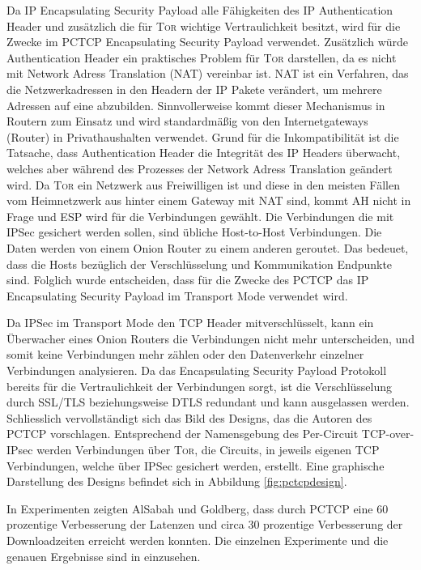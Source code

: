 \documentclass[fleqn,envcountsame,runningheads,10pt,a4paper]{llncs}
\begin{document}
Da IP Encapsulating Security Payload alle Fähigkeiten des IP Authentication Header und zusätzlich die für \textsc{Tor} wichtige Vertraulichkeit besitzt, wird für die Zwecke im PCTCP Encapsulating Security Payload verwendet.
Zusätzlich würde Authentication Header ein praktisches Problem für \textsc{Tor} darstellen, da es nicht mit Network Adress Translation (NAT) \cite{rfc:nat} vereinbar ist.
NAT ist ein Verfahren, das die Netzwerkadressen in den  Headern der IP Pakete verändert, um mehrere Adressen auf eine abzubilden.
Sinnvollerweise kommt dieser Mechanismus in Routern zum Einsatz und wird standardmäßig von den Internetgateways (Router) in Privathaushalten verwendet.
Grund für die Inkompatibilität ist die Tatsache, dass Authentication Header die Integrität des IP Headers überwacht, welches aber während des Prozesses der Network Adress Translation geändert wird.
Da \textsc{Tor} ein Netzwerk aus Freiwilligen ist und diese in den meisten Fällen vom Heimnetzwerk aus hinter einem Gateway mit NAT sind, kommt AH nicht in Frage und ESP wird für die Verbindungen gewählt.
Die Verbindungen die mit IPSec gesichert werden sollen, sind übliche Host-to-Host Verbindungen.
Die Daten werden von einem Onion Router zu einem anderen geroutet. Das bedeuet, dass die Hosts bezüglich der Verschlüsselung und Kommunikation Endpunkte sind.
Folglich wurde entscheiden, dass für die Zwecke des PCTCP das IP Encapsulating Security Payload im Transport Mode verwendet wird.

Da IPSec im Transport Mode den TCP Header mitverschlüsselt, kann ein Überwacher eines Onion Routers die Verbindungen nicht mehr unterscheiden, und somit keine Verbindungen mehr zählen oder den Datenverkehr einzelner Verbindungen analysieren.
Da das Encapsulating Security Payload Protokoll bereits für die Vertraulichkeit der Verbindungen sorgt, ist die Verschlüsselung durch SSL/TLS beziehungsweise DTLS redundant und kann ausgelassen werden.
Schliesslich vervollständigt sich das Bild des Designs, das die Autoren des PCTCP vorschlagen.
Entsprechend der Namensgebung des Per-Circuit TCP-over-IPsec werden Verbindungen über \textsc{Tor}, die Circuits, in jeweils eigenen TCP Verbindungen, welche über IPSec gesichert werden, erstellt.
Eine graphische Darstellung des Designs befindet sich in Abbildung \ref{fig:pctcpdesign}.

In Experimenten zeigten AlSabah und Goldberg, dass durch PCTCP eine 60 prozentige Verbesserung der Latenzen und circa 30 prozentige Verbesserung der Downloadzeiten erreicht werden konnten.
Die einzelnen Experimente und die genauen Ergebnisse sind in \cite{pctcp} einzusehen.
\end{document}

